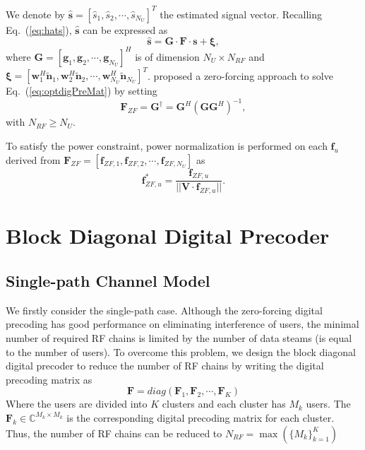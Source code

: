 \documentclass[conference]{IEEEtran}
\begin{document}
We denote by $\hat{\bm s}=\left[\hat{s}_1,\hat{s}_2,\cdots,\hat{s}_{N_U}\right]^T$ the estimated signal vector. Recalling Eq.~(\ref{eq:hats}), $\hat{\bm s}$ can be expressed as \cite{alkhateeb2014channel}
\begin{equation}\label{eq:hatsAllUsers}
\hat{\bm s} = {\bm G}\cdot \bm{F} \cdot\bm{s} + \bm{\xi},
\end{equation}
where ${\bm G}=\left[{\bm g}_1,{\bm g}_2,\cdots,{\bm g}_{N_U}\right]^H$ is of dimension $N_U\times N_{RF}$ and ${\bm \xi}=\left[{\bm w}_1^H\tilde{\bm n}_1,{\bm w}_2^H\tilde{\bm n}_2,\cdots,{\bm w}_{N_U}^H\tilde{\bm n}_{N_U}\right]^T$. \cite{alkhateeb2014channel} proposed a zero-forcing approach to solve Eq.~(\ref{eq:optdigPreMat}) by setting
\begin{equation}\label{eq:ZFU-HBF}
\bm{F}_{ZF}={\bm G}^\dagger = \bm{G}^H(\bm{G}\bm{G}^H)^{-1},
\end{equation}
with $N_{RF}\geq N_U$.

To satisfy the power constraint, power normalization is performed on each ${\bm f}_u$ derived from $\bm{F}_{ZF}=\left[\bm{f}_{ZF,1},\bm{f}_{ZF,2},\cdots,\bm{f}_{ZF,N_U}\right]$ as
\begin{equation}\label{eq:ZFU-HBF}
\bm{f}^*_{ZF,u} = {\frac{\bm{f}_{ZF,u}}{||\bm{V}\cdot\bm{f}_{ZF,u}||}}.
\end{equation}

 

\section{Block Diagonal Digital Precoder}
\subsection{Single-path Channel Model}
We firstly consider the single-path case. Although the zero-forcing digital precoding has good performance on eliminating interference of users, the minimal number of required RF chains is limited by the number of data steams (is equal to the number of users). To overcome this problem, we design the block diagonal digital precoder to reduce the number of RF chains by writing the digital precoding matrix as
\begin{equation}\label{digitalblock}
	\bm{F} = diag(\bm{F}_1, \bm{F}_2, \cdots, \bm{F}_K)
\end{equation}
Where the users are divided into $K$ clusters and each cluster has $M_k$ users. The $\bm{F}_k\in \mathbb{C}^{M_k\times M_k}$ is the corresponding digital precoding matrix for each cluster. Thus, the number of RF chains can be reduced to $N_{RF} = \max(\{M_k\}_{k=1}^{K})$ 
\end{document}
